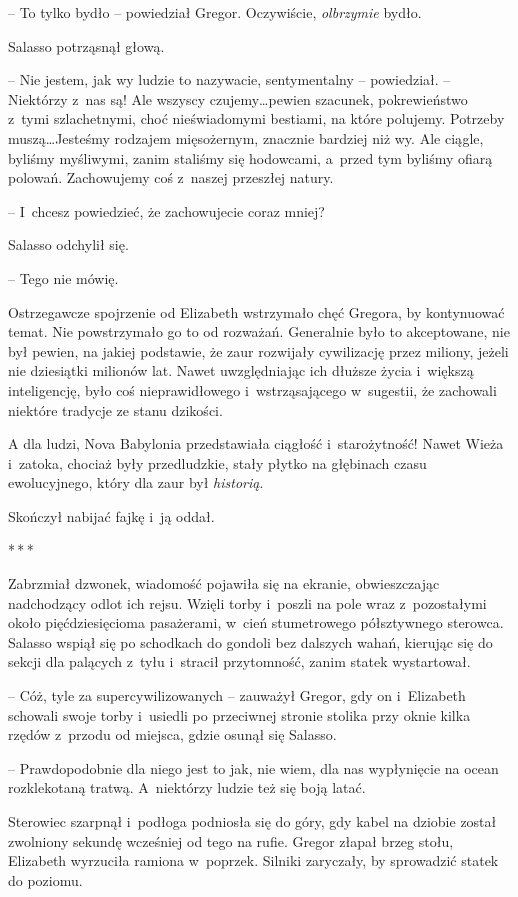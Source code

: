 \documentclass[oneside,polish,12pt,sfheadings]{mwbk}
\newcommand{\threeast}{\bigskip\par\centerline{*\,*\,*}\medskip\par}%
\begin{document}
-- To tylko bydło -- powiedział Gregor. Oczywiście, \emph{olbrzymie}
bydło.

Salasso potrząsnął głową. 

-- Nie jestem, jak wy ludzie to nazywacie,
sentymentalny -- powiedział. -- Niektórzy z~nas są! Ale wszyscy czujemy\ldots pewien szacunek, pokrewieństwo z~tymi szlachetnymi, choć nieświadomymi
bestiami, na które polujemy. Potrzeby muszą\ldots Jesteśmy rodzajem
mięsożernym, znacznie bardziej niż wy. Ale ciągle, byliśmy myśliwymi,
zanim staliśmy się hodowcami, a~przed tym byliśmy ofiarą polowań.
Zachowujemy coś z~naszej przeszłej natury.

-- I~chcesz powiedzieć, że zachowujecie coraz mniej?

Salasso odchylił się. 

-- Tego nie mówię.

Ostrzegawcze spojrzenie od Elizabeth wstrzymało chęć Gregora, by
kontynuować temat. Nie powstrzymało go to od rozważań. Generalnie było
to akceptowane, nie był pewien, na jakiej podstawie, że zaur rozwijały
cywilizację przez miliony, jeżeli nie dziesiątki milionów lat. Nawet
uwzględniając ich dłuższe życia i~większą inteligencję, było coś
nieprawidłowego i~wstrząsającego w~sugestii, że zachowali niektóre
tradycje ze stanu dzikości.

A dla ludzi, Nova Babylonia przedstawiała ciągłość i~starożytność! Nawet
Wieża i~zatoka, chociaż były przedludzkie, stały płytko na głębinach
czasu ewolucyjnego, który dla zaur był \emph{historią}.

Skończył nabijać fajkę i~ją oddał.

\threeast

Zabrzmiał dzwonek, wiadomość pojawiła się na ekranie, obwieszczając
nadchodzący odlot ich rejsu. Wzięli torby i~poszli na pole wraz z~pozostałymi około pięćdziesięcioma pasażerami, w~cień stumetrowego
półsztywnego sterowca. Salasso wspiął się po schodkach do gondoli bez
dalszych wahań, kierując się do sekcji dla palących z~tyłu i~stracił
przytomność, zanim statek wystartował.

-- Cóż, tyle za supercywilizowanych -- zauważył Gregor, gdy on i~Elizabeth
schowali swoje torby i~usiedli po przeciwnej stronie stolika przy oknie
kilka rzędów z~przodu od miejsca, gdzie osunął się Salasso.

-- Prawdopodobnie dla niego jest to jak, nie wiem, dla nas wypłynięcie na
ocean rozklekotaną tratwą. A~niektórzy ludzie też się boją latać.

Sterowiec szarpnął i~podłoga podniosła się do góry, gdy kabel na dziobie
został zwolniony sekundę wcześniej od tego na rufie. Gregor złapał brzeg
stołu, Elizabeth wyrzuciła ramiona w~poprzek. Silniki zaryczały, by
sprowadzić statek do poziomu.
\end{document}
